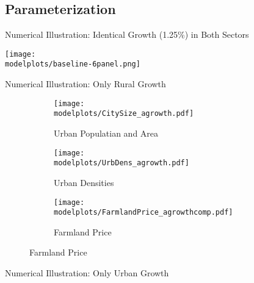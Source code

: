 \documentclass[aspectratio=169]{beamer}
\begin{document}


\subsection{Parameterization}


\begin{v75mins}
\begin{frame}{Numerical Illustration: Identical Growth (1.25\%) in Both Sectors}

	\begin{adjustbox}{center}
		\texttt{[image: \\modelplots/baseline-6panel.png]}
	\end{adjustbox}
	
\end{frame}

\begin{frame}{Numerical Illustration: Only Rural Growth}
\begin{figure}
	
	\begin{subfigure}[t]{0.32\textwidth}
		\begin{centering}
			\texttt{[image: \\modelplots/CitySize\_agrowth.pdf]}
			\caption{Urban Populatian and Area}
		\end{centering}
	\end{subfigure}
	\hfill
	\begin{subfigure}[t]{0.32\textwidth}
		\begin{centering}
			\texttt{[image: \\modelplots/UrbDens\_agrowth.pdf]}
			\caption{Urban Densities}
		\end{centering}
	\end{subfigure}
	\hfill
	\begin{subfigure}[t]{0.32\textwidth}
		\begin{centering}
			\texttt{[image: \\modelplots/FarmlandPrice\_agrowthcomp.pdf]}\end{centering}
			\caption{Farmland Price}
	\end{subfigure}
\end{figure}
\end{frame}

\begin{frame}{Numerical Illustration: Only Urban Growth}
	\begin{figure}
		

\end{figure}
\end{frame}
\end{v75mins}
\end{document}
